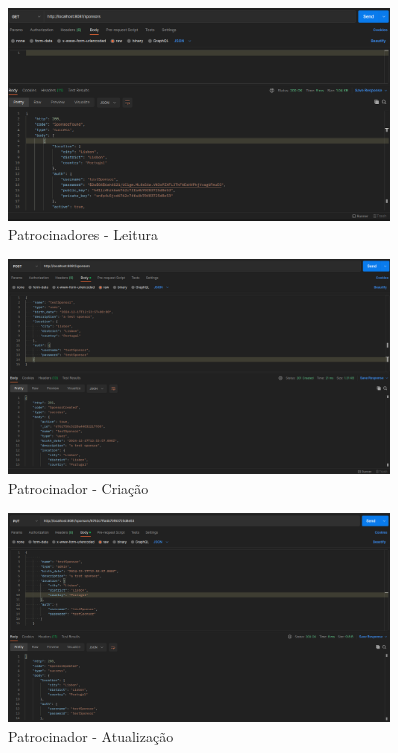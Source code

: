 \documentclass[12pt,a4paper,final]{article}
\begin{document}
    \begin{figure}[H]
        \centering
        \includegraphics[width=0.9\textwidth]{get_sponsors}
        \caption{Patrocinadores - Leitura}
        \label{fig:get_sponsors}
    \end{figure}

    \begin{figure}[H]
        \centering
        \includegraphics[width=0.9\textwidth]{cr_sponsor}
        \caption{Patrocinador - Criação}
        \label{fig:cr_sponsor}
    \end{figure}

    \begin{figure}[H]
        \centering
        \includegraphics[width=0.9\textwidth]{update_sponsor}
        \caption{Patrocinador - Atualização}
        \label{fig:update_sponsor}
    \end{figure}
\end{document}
